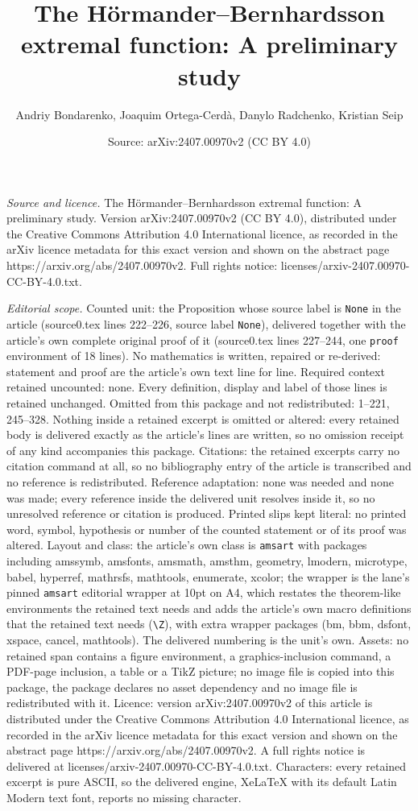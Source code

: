\documentclass[10pt,a4paper]{amsart}
\title[The H\"ormander--Bernhardsson extremal function: A prelimina]{The H\"ormander--Bernhardsson extremal function: A preliminary study}
\author{Andriy Bondarenko, Joaquim Ortega-Cerd\`a, Danylo Radchenko, Kristian Seip}
\date{Source: arXiv:2407.00970v2 (CC BY 4.0)}
\begin{document}
\maketitle

\noindent\emph{Source and licence.} The H\"ormander--Bernhardsson extremal function: A preliminary study. Version arXiv:2407.00970v2 (CC BY 4.0), distributed under the Creative Commons Attribution 4.0 International licence, as recorded in the arXiv licence metadata for this exact version and shown on the abstract page https://arxiv.org/abs/2407.00970v2. Full rights notice: licenses/arxiv-2407.00970-CC-BY-4.0.txt.\par\smallskip

\noindent\textit{Editorial scope.} Counted unit: the Proposition whose source label is \texttt{None} in the article (source0.tex lines 222--226, source label \texttt{None}), delivered together with the article's own complete original proof of it (source0.tex lines 227--244, one \texttt{proof} environment of 18 lines). No mathematics is written, repaired or re-derived: statement and proof are the article's own text line for line. Required context retained uncounted: none. Every definition, display and label of those lines is retained unchanged. Omitted from this package and not redistributed: 1--221, 245--328. Nothing inside a retained excerpt is omitted or altered: every retained body is delivered exactly as the article's lines are written, so no omission receipt of any kind accompanies this package. Citations: the retained excerpts carry no citation command at all, so no bibliography entry of the article is transcribed and no reference is redistributed. Reference adaptation: none was needed and none was made; every reference inside the delivered unit resolves inside it, so no unresolved reference or citation is produced. Printed slips kept literal: no printed word, symbol, hypothesis or number of the counted statement or of its proof was altered. Layout and class: the article's own class is \texttt{amsart} with packages including amssymb, amsfonts, amsmath, amsthm, geometry, lmodern, microtype, babel, hyperref, mathrsfs, mathtools, enumerate, xcolor; the wrapper is the lane's pinned \texttt{amsart} editorial wrapper at 10pt on A4, which restates the theorem-like environments the retained text needs and adds the article's own macro definitions that the retained text needs (\texttt{\textbackslash Z}), with extra wrapper packages (bm, bbm, dsfont, xspace, cancel, mathtools). The delivered numbering is the unit's own. Assets: no retained span contains a figure environment, a graphics-inclusion command, a PDF-page inclusion, a table or a TikZ picture; no image file is copied into this package, the package declares no asset dependency and no image file is redistributed with it. Licence: version arXiv:2407.00970v2 of this article is distributed under the Creative Commons Attribution 4.0 International licence, as recorded in the arXiv licence metadata for this exact version and shown on the abstract page https://arxiv.org/abs/2407.00970v2. A full rights notice is delivered at licenses/arxiv-2407.00970-CC-BY-4.0.txt. Characters: every retained excerpt is pure ASCII, so the delivered engine, XeLaTeX with its default Latin Modern text font, reports no missing character.
\end{document}
